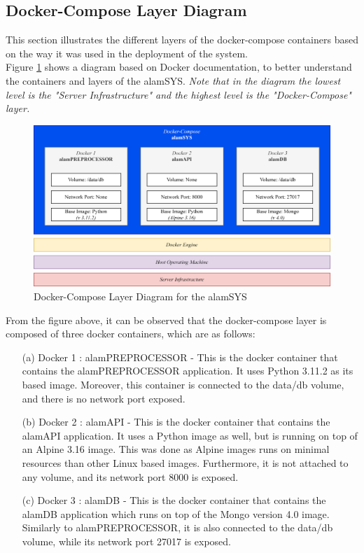 \subsection{Docker-Compose Layer Diagram}
\label{subsec:docker_compose_diagram}
This section illustrates the different layers of the docker-compose 
containers based on the way it was used in the 
deployment of the system.
\hfill \\

Figure \ref{fig:docker_compose_layout} shows a diagram based
on Docker documentation, to better understand the containers and layers
of the alamSYS. \textit{Note that in the diagram the lowest level is the "Server Infrastructure"
and the highest level is the "Docker-Compose" layer.}
\begin{figure}[ht]
    \centering
    \includegraphics[width=1\textwidth]{./assets/Chapter_3/Docker-Compose Layout.png}
    \caption{Docker-Compose Layer Diagram for the alamSYS}
    \label{fig:docker_compose_layout}
\end{figure}
\FloatBarrier

From the figure above, it can be observed that the docker-compose layer is composed
of three docker containers, which are as follows:
\begin{itemize}
    \item[(a)] Docker 1 : alamPREPROCESSOR - This is the docker container that contains
    the alamPREPROCESSOR application. It uses Python 3.11.2 as its based image. Moreover,
    this container is connected to the data/db volume, and there is no network port exposed.
    \item[(b)] Docker 2 : alamAPI - This is the docker container that contains the alamAPI
    application. It uses a Python image as well, but is running on top of an Alpine 3.16 image.
    This was done as Alpine images runs on minimal resources than other Linux based images.
    Furthermore, it is not attached to any volume, and its network port
    8000 is exposed.
    \item[(c)] Docker 3 : alamDB - This is the docker container that contains the alamDB application
    which runs on top of the Mongo version 4.0 image. Similarly to alamPREPROCESSOR, it is also 
    connected to the data/db volume, while its network port 27017 is exposed.
\end{itemize}